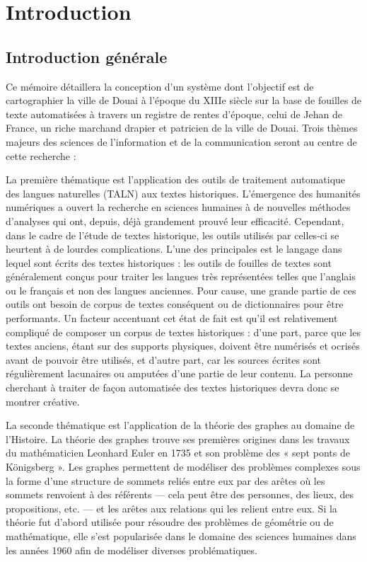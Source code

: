\chapter{Introduction}
\section{Introduction générale}

 Ce mémoire détaillera la conception d’un système dont l’objectif est de cartographier la ville de Douai à l’époque du XIIIe siècle sur la base de fouilles de texte automatisées à travers un registre de rentes d'époque, celui de Jehan de France, un riche marchand drapier et patricien de la ville de Douai. Trois thèmes majeurs des sciences de l'information et de la communication seront au centre de cette recherche :
 
 La première thématique est l’application des outils de traitement automatique des langues naturelles (TALN) aux textes historiques. L’émergence des humanités numériques a ouvert la recherche en sciences humaines à de nouvelles méthodes d’analyses qui ont, depuis, déjà grandement prouvé leur efficacité. Cependant, dans le cadre de l’étude de textes historique, les outils utilisés par celles-ci se heurtent à de lourdes complications. L’une des principales est le langage dans lequel sont écrits des textes historiques : les outils de fouilles de textes sont généralement conçus pour traiter les langues très représentées telles que l’anglais ou le français et non des langues anciennes. Pour cause, une grande partie de ces outils ont besoin de corpus de textes conséquent ou de dictionnaires pour être performants. Un facteur accentuant cet état de fait est qu’il est relativement compliqué de composer un corpus de textes historiques : d’une part, parce que les textes anciens, étant sur des supports physiques, doivent être numérisés et ocrisés avant de pouvoir être utilisés, et d’autre part, car les sources écrites sont régulièrement lacunaires ou amputées d’une partie de leur contenu. La personne cherchant à traiter de façon automatisée des textes historiques devra donc se montrer créative.
 
La seconde thématique est l’application de la théorie des graphes au domaine de l’Histoire. La théorie des graphes trouve ses premières origines dans les travaux du mathématicien Leonhard Euler en 1735 et son problème des « sept ponts de Königsberg ». Les graphes permettent de modéliser des problèmes complexes sous la forme d’une structure de sommets reliés entre eux par des arêtes où les sommets renvoient à des référents — cela peut être des personnes, des lieux, des propositions, etc. — et les arêtes aux relations qui les relient entre eux. Si la théorie fut d’abord utilisée pour résoudre des problèmes de géométrie ou de mathématique, elle s’est popularisée dans le domaine des sciences humaines dans les années 1960 afin de modéliser diverses problématiques.

